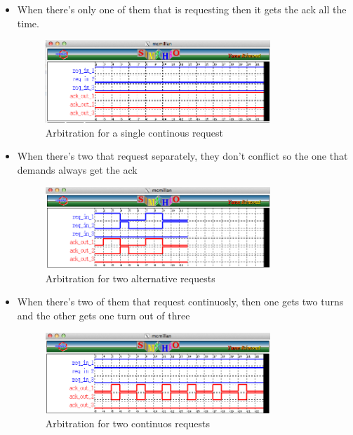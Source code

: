 \documentclass{article}
\begin{document}
\begin{itemize}

\item When there's only one of them that is requesting then it gets the ack all 
the time.

\begin{figure}[!ht]
\begin{center}
\includegraphics[width=0.8\textwidth, natwidth=610,natheight=642] {img/all-req-1.png}
\end{center}
\label{all-req-1}
\caption{Arbitration for a single continous request}
\end{figure}

\item When there's two that request separately, they don't conflict so the one that
demands always get the ack

\begin{figure}[!ht]
\begin{center}
\includegraphics[width=0.8\textwidth, natwidth=610,natheight=642] {img/two-alternative-req.png}
\end{center}
\label{two-alternate-req}
\caption{Arbitration for two alternative requests}
\end{figure}


\item When there's two of them that request continuosly, then one gets two turns and 
the other gets one turn out of three

\begin{figure}[!ht]
\begin{center}
\includegraphics[width=0.8\textwidth, natwidth=610,natheight=642] {img/two-continuosly.png}
\end{center}
\label{two-continuosly}
\caption{Arbitration for two continuos requests}
\end{figure}


\end{itemize}
\end{document}
